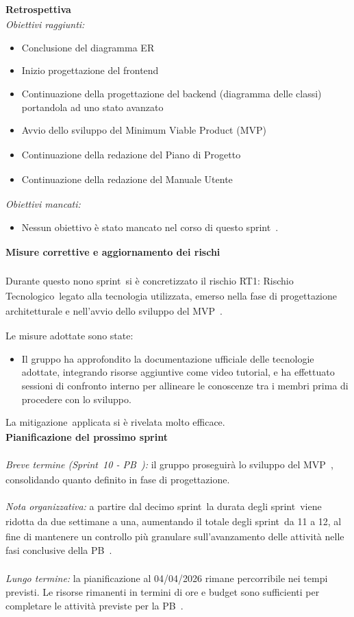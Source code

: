 \documentclass[a4paper,12pt]{article}
\newcommand{\pediceG}{\texorpdfstring{\textsubscript{\scalebox{0.6}{\textbf{G}}}~}{G}}
\begin{document}
\newpage
\noindent\textbf{Retrospettiva\pediceG}\\
\textit{Obiettivi raggiunti:}
\begin{itemize}
    \item Conclusione del diagramma ER
    \item Inizio progettazione del frontend
    \item Continuazione della progettazione del backend (diagramma delle classi) portandola ad uno stato avanzato
    \item Avvio dello sviluppo del Minimum Viable Product (MVP)\pediceG
    \item Continuazione della redazione del Piano di Progetto\pediceG
    \item Continuazione della redazione del Manuale Utente\pediceG
\end{itemize}
\textit{Obiettivi mancati:}
\begin{itemize}
    \item Nessun obiettivo è stato mancato nel corso di questo sprint\pediceG.
\end{itemize}
 
\noindent\textbf{Misure correttive e aggiornamento dei rischi\pediceG}\\\\
Durante questo nono sprint\pediceG si è concretizzato il rischio RT1: Rischio Tecnologico\pediceG legato alla tecnologia utilizzata, emerso nella fase di progettazione architetturale e nell'avvio dello sviluppo del MVP\pediceG.
 
Le misure adottate sono state:
\begin{itemize}
    \item Il gruppo ha approfondito la documentazione ufficiale delle tecnologie adottate, integrando risorse aggiuntive come video tutorial, e ha effettuato sessioni di confronto interno per allineare le conoscenze tra i membri prima di procedere con lo sviluppo.
\end{itemize}
 
La mitigazione\pediceG applicata si è rivelata molto efficace.\\
 
\noindent\textbf{Pianificazione del prossimo sprint}\\\\
\textit{Breve termine (Sprint\pediceG 10 - PB\pediceG):} il gruppo proseguirà lo sviluppo del MVP\pediceG, consolidando quanto definito in fase di progettazione. \\\\
 \textit{Nota organizzativa:} a partire dal decimo sprint\pediceG la durata degli sprint\pediceG viene ridotta da due settimane a una, aumentando il totale degli sprint\pediceG da 11 a 12, al fine di mantenere un controllo più granulare sull'avanzamento delle attività nelle fasi conclusive della PB\pediceG.\\\\
\textit{Lungo termine:} la pianificazione al 04/04/2026 rimane percorribile nei tempi previsti. Le risorse rimanenti in termini di ore e budget sono sufficienti per completare le attività previste per la PB\pediceG.\\\
\end{document}
